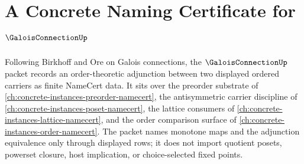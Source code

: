 \chapter{A Concrete Naming Certificate for $\GaloisConnectionUp$}
\label{ch:concrete-instances-galois-connection-namecert}

Following Birkhoff and Ore on Galois connections, the $\GaloisConnectionUp$ packet records an order-theoretic adjunction between two displayed ordered carriers as finite NameCert data. It sits over the preorder substrate of \autoref{ch:concrete-instances-preorder-namecert}, the antisymmetric carrier discipline of \autoref{ch:concrete-instances-poset-namecert}, the lattice consumers of \autoref{ch:concrete-instances-lattice-namecert}, and the order comparison surface of \autoref{ch:concrete-instances-order-namecert}. The packet names monotone maps and the adjunction equivalence only through displayed rows; it does not import quotient posets, powerset closure, host implication, or choice-selected fixed points.

